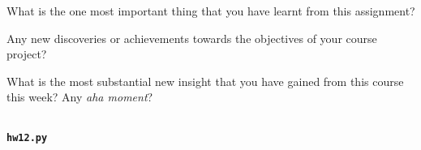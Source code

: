 What is the one most important thing that you have learnt from this assignment?

\vspace*{3mm}
\hrulefill

\vspace*{3mm}
\hrulefill

Any new discoveries or achievements towards the objectives of your course project?

\vspace*{3mm}
\hrulefill

\vspace*{3mm}
\hrulefill

What is the most substantial new insight that you have gained from this course this week? Any \emph{aha moment}?

\vspace*{3mm}
\hrulefill

\vspace*{3mm}
\hrulefill

\newpage
\begin{appendices}
\newpage
\lhead{}
\section{}\label{hw12code}
\textbf{\Large\texttt{hw12.py}}
\end{appendices}


